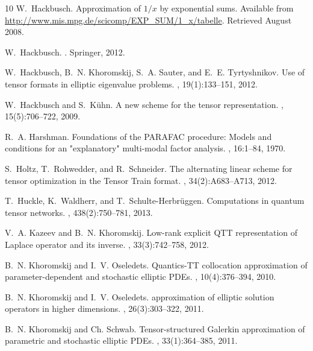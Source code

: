 \documentclass[11pt, a4paper]{article}
\begin{document}
\begin{thebibliography}{10}
W.~Hackbusch.
\newblock Approximation of $1/x$ by exponential sums.
\newblock Available from
  \url{http://www.mis.mpg.de/scicomp/EXP_SUM/1_x/tabelle}. Retrieved August
  2008.

W.~Hackbusch.
.
\newblock Springer, 2012.

W.~Hackbusch, B.~N. Khoromskij, S.~A. Sauter, and E.~E. Tyrtyshnikov.
\newblock Use of tensor formats in elliptic eigenvalue problems.
, 19(1):133--151, 2012.

W.~Hackbusch and S.~K{\"u}hn.
\newblock A new scheme for the tensor representation.
, 15(5):706--722, 2009.

R.~A. Harshman.
\newblock Foundations of the {PARAFAC} procedure: Models and conditions for an
  "explanatory" multi-modal factor analysis.
, 16:1--84, 1970.

S.~Holtz, T.~Rohwedder, and R.~Schneider.
\newblock The alternating linear scheme for tensor optimization in the {T}ensor
  {T}rain format.
, 34(2):A683--A713, 2012.

T.~Huckle, K.~Waldherr, and T.~Schulte-Herbr{\"u}ggen.
\newblock Computations in quantum tensor networks.
, 438(2):750--781, 2013.

V.~A. Kazeev and B.~N. Khoromskij.
\newblock Low-rank explicit {QTT} representation of {Laplace} operator and its
  inverse.
, 33(3):742--758, 2012.

B.~N. Khoromskij and I.~V. Oseledets.
\newblock Quantics-{TT} collocation approximation of parameter-dependent and
  stochastic elliptic {PDEs}.
, 10(4):376--394, 2010.

B.~N. Khoromskij and I.~V. Oseledets.
 approximation of elliptic solution operators in higher
  dimensions.
, 26(3):303--322, 2011.

B.~N. Khoromskij and Ch. Schwab.
\newblock Tensor-structured {G}alerkin approximation of parametric and
  stochastic elliptic {PDEs}.
, 33(1):364--385, 2011.


\end{thebibliography}
\end{document}
